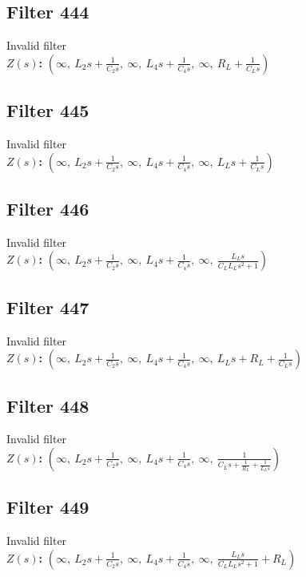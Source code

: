 \documentclass{article}
\begin{document}
\subsection*{Filter 444}
Invalid filter \\ 
\textbf{$Z(s)$:} $\left( \infty, \  L_{2} s + \frac{1}{C_{2} s}, \  \infty, \  L_{4} s + \frac{1}{C_{4} s}, \  \infty, \  R_{L} + \frac{1}{C_{L} s}\right)$ \\ 
\subsection*{Filter 445}
Invalid filter \\ 
\textbf{$Z(s)$:} $\left( \infty, \  L_{2} s + \frac{1}{C_{2} s}, \  \infty, \  L_{4} s + \frac{1}{C_{4} s}, \  \infty, \  L_{L} s + \frac{1}{C_{L} s}\right)$ \\ 
\subsection*{Filter 446}
Invalid filter \\ 
\textbf{$Z(s)$:} $\left( \infty, \  L_{2} s + \frac{1}{C_{2} s}, \  \infty, \  L_{4} s + \frac{1}{C_{4} s}, \  \infty, \  \frac{L_{L} s}{C_{L} L_{L} s^{2} + 1}\right)$ \\ 
\subsection*{Filter 447}
Invalid filter \\ 
\textbf{$Z(s)$:} $\left( \infty, \  L_{2} s + \frac{1}{C_{2} s}, \  \infty, \  L_{4} s + \frac{1}{C_{4} s}, \  \infty, \  L_{L} s + R_{L} + \frac{1}{C_{L} s}\right)$ \\ 
\subsection*{Filter 448}
Invalid filter \\ 
\textbf{$Z(s)$:} $\left( \infty, \  L_{2} s + \frac{1}{C_{2} s}, \  \infty, \  L_{4} s + \frac{1}{C_{4} s}, \  \infty, \  \frac{1}{C_{L} s + \frac{1}{R_{L}} + \frac{1}{L_{L} s}}\right)$ \\ 
\subsection*{Filter 449}
Invalid filter \\ 
\textbf{$Z(s)$:} $\left( \infty, \  L_{2} s + \frac{1}{C_{2} s}, \  \infty, \  L_{4} s + \frac{1}{C_{4} s}, \  \infty, \  \frac{L_{L} s}{C_{L} L_{L} s^{2} + 1} + R_{L}\right)$ \\ 
\end{document}
